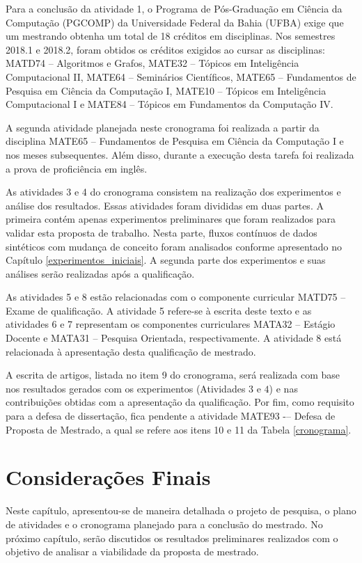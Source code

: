 \documentclass[qual, classic, a4paper]{ufbathesis}
\begin{document}
Para a conclusão da atividade 1, 
o Programa de Pós-Graduação em Ciência da Computação (PGCOMP) da Universidade Federal da Bahia (UFBA) exige que um mestrando obtenha um total de 18 créditos em disciplinas. 
Nos semestres 2018.1 e 2018.2, foram obtidos os créditos exigidos ao cursar as disciplinas: 
MATD74 -- Algoritmos e Grafos, MATE32 -- Tópicos em Inteligência Computacional II, MATE64 -- Seminários Científicos, MATE65 -- Fundamentos de Pesquisa em Ciência da Computação I,
MATE10 -- Tópicos em Inteligência Computacional I e MATE84 -- Tópicos em Fundamentos da Computação IV.

A segunda atividade planejada neste cronograma foi realizada a partir da disciplina MATE65 -- Fundamentos de Pesquisa em Ciência da Computação I 
e nos meses subsequentes. Além disso, durante a execução desta tarefa foi realizada a prova de proficiência em inglês.

As atividades 3 e 4 do cronograma consistem na realização dos experimentos e análise dos resultados. 
Essas atividades foram divididas em duas partes. 
A primeira contém apenas experimentos preliminares que foram realizados para validar esta proposta de trabalho. 
Nesta parte, fluxos contínuos de dados sintéticos com mudança de conceito foram analisados conforme apresentado no Capítulo \ref{experimentos_iniciais}. 
A segunda parte dos experimentos e suas análises serão realizadas após a qualificação.

As atividades 5 e 8 estão relacionadas com o componente curricular MATD75 -- Exame de qualificação. A atividade 5 refere-se à escrita deste texto e as atividades 6 e 7 representam os componentes curriculares MATA32 -- Estágio Docente e MATA31 -- Pesquisa Orientada, respectivamente. A atividade 8 está relacionada à apresentação desta qualificação de mestrado.
 
A escrita de artigos, listada no item 9 do cronograma, será realizada com base nos resultados gerados com os experimentos (Atividades $3$ e $4$) e nas contribuições obtidas com a apresentação da qualificação. Por fim, como requisito para a defesa de dissertação, fica pendente a atividade MATE93 -– Defesa de Proposta de Mestrado, a qual se refere aos itens 10 e 11 da Tabela \ref{cronograma}. 

\section{Considerações Finais}

Neste capítulo, apresentou-se de maneira detalhada o projeto de pesquisa, o plano de atividades e o cronograma planejado para a conclusão do mestrado. 
No próximo capítulo, serão discutidos os resultados preliminares realizados com o objetivo de analisar a viabilidade da proposta de mestrado.
\end{document}
